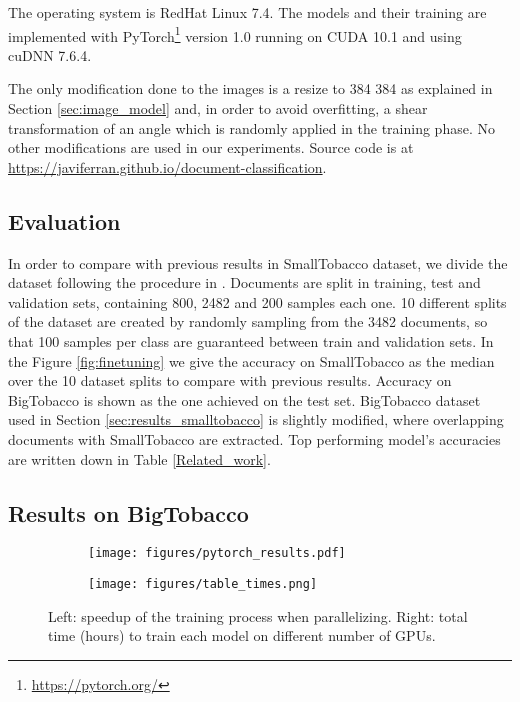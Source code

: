 \documentclass[runningheads]{llncs}
\begin{document}
The operating system is RedHat Linux 7.4. The models and their training are implemented with PyTorch\footnote{\url{https://pytorch.org/}} version 1.0 running on CUDA 10.1 and using cuDNN 7.6.4.

The only modification done to the images  is a resize to 384  384 as explained in Section \ref{sec:image_model} and, in order to avoid overfitting, a shear transformation of an angle  \cite{CNNs_analysis} which is randomly applied in the training phase. No other modifications are used in our experiments. Source code is at \url{https://javiferran.github.io/document-classification}.

\subsection{Evaluation}
In order to compare with previous results in SmallTobacco dataset, we divide the dataset following the procedure in \cite{tobacco3482}. Documents are split in training, test and validation sets, containing 800, 2482 and 200 samples each one. 10 different splits of the dataset are created by randomly sampling from the 3482 documents, so that 100 samples per class are guaranteed between train and validation sets. In the Figure \ref{fig:finetuning} we give the accuracy on SmallTobacco as the median over the 10 dataset splits to compare with previous results. Accuracy on BigTobacco is shown as the one achieved on the test set. BigTobacco dataset used in Section \ref{sec:results_smalltobacco} is slightly modified, where overlapping documents with SmallTobacco are extracted. Top performing model's accuracies are written down in Table \ref{Related_work}.

\subsection{Results on BigTobacco}

\begin{figure}[H]
\centering
\begin{subfigure}{.6\textwidth}
  \centering
  \texttt{[image: figures/pytorch\_results.pdf]}
\end{subfigure}\begin{subfigure}{.4\textwidth}
  \centering
  \texttt{[image: figures/table\_times.png]}
\end{subfigure}
\caption{Left: speedup of the training process when parallelizing. Right: total time (hours) to train each model on different number of GPUs.}
\label{fig:times}
\end{figure}
\end{document}
